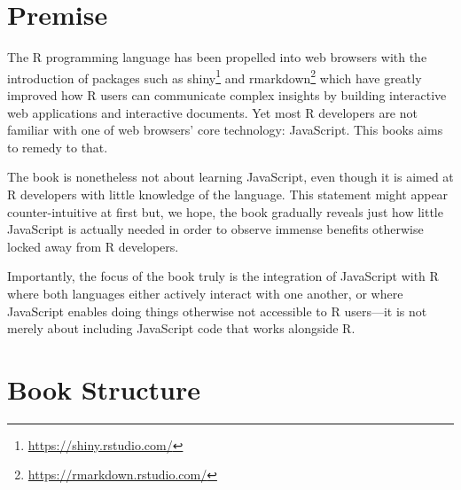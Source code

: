 \documentclass[
]{krantz}
\renewcommand{\href}[2]{#2\footnote{\url{#1}}}
\begin{document}
\hypertarget{premise}{%
\section*{Premise}\label{premise}}


The R programming language has been propelled into web browsers with the introduction of packages such as \href{https://shiny.rstudio.com/}{shiny} \citep{R-shiny} and \href{https://rmarkdown.rstudio.com/}{rmarkdown} \citep{R-rmarkdown} which have greatly improved how R users can communicate complex insights by building interactive web applications and interactive documents. Yet most R developers are not familiar with one of web browsers' core technology: JavaScript. This books aims to remedy to that.

The book is nonetheless not about learning JavaScript, even though it is aimed at R developers with little knowledge of the language. This statement might appear counter-intuitive at first but, we hope, the book gradually reveals just how little JavaScript is actually needed in order to observe immense benefits otherwise locked away from R developers.

Importantly, the focus of the book truly is the integration of JavaScript with R where both languages either actively interact with one another, or where JavaScript enables doing things otherwise not accessible to R users---it is not merely about including JavaScript code that works alongside R.

\hypertarget{book-structure}{%
\section*{Book Structure}\label{book-structure}}
\end{document}
